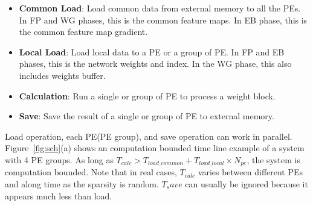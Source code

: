 \begin{itemize}
	\item {{\bf{Common Load}}: Load common data from external memory to all the PEs. In FP and WG phases, this is the common feature maps. In EB phase, this is the common feature map gradient.}
    \item {{\bf{Local Load}}: Load local data to a PE or a group of PE. In FP and EB phases, this is the network weights and index. In the WG phase, this also includes weights buffer.}
    \item {{\bf{Calculation}}: Run a single or group of PE to process a weight block.}
    \item {{\bf{Save}}: Save the result of a single or group of PE to external memory.}
\end{itemize}

Load operation, each PE(PE group), and save operation can work in parallel. Figure~\ref{fig:sch}(a) shows an computation bounded time line example of a system with 4 PE groups. As long as $T_{calc}>T_{load\_common} + T_{load\_local}\times N_{pe}$, the system is computation bounded. Note that in real cases, $T_{calc}$ varies between different PEs and along time as the sparsity is random. $T_save$ can usually be ignored because it appears much less than load.   

